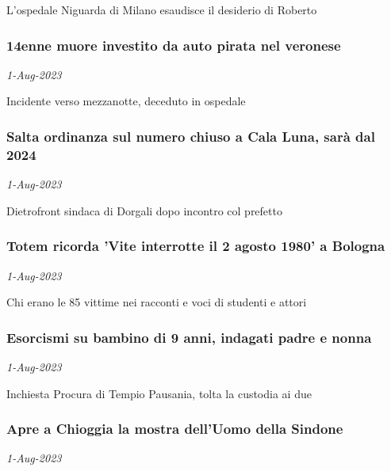 L'ospedale Niguarda di Milano esaudisce il desiderio di Roberto
\subsubsection{14enne muore investito da auto pirata nel veronese \href{https://www.ansa.it/sito/notizie/cronaca/2023/08/01/14enne-muore-investito-da-auto-pirata-nel-veronese_3a935f6f-c3d1-4bc3-8579-039319435df6.html}{}}
\textit{1-Aug-2023}

Incidente verso mezzanotte, deceduto in ospedale
\subsubsection{Salta ordinanza sul numero chiuso a Cala Luna, sar\`{a} dal 2024 \href{https://www.ansa.it/sito/notizie/cronaca/2023/08/01/salta-ordinanza-sul-numero-chiuso-a-cala-luna-sara-dal-2024_ebcdc2e1-25b6-4114-9f1d-d1417bf8f794.html}{}}
\textit{1-Aug-2023}

Dietrofront sindaca di Dorgali dopo incontro col prefetto
\subsubsection{Totem ricorda 'Vite interrotte il 2 agosto 1980' a Bologna \href{https://www.ansa.it/sito/notizie/cronaca/2023/08/01/totem-ricorda-vite-interrotte-il-2-agosto-1980-a-bologna_c80e7917-3604-4a93-9a0b-5dd5e783bdd8.html}{}}
\textit{1-Aug-2023}

Chi erano le 85 vittime nei racconti e voci di studenti e attori
\subsubsection{Esorcismi su bambino di 9 anni, indagati padre e nonna \href{https://www.ansa.it/sito/notizie/cronaca/2023/08/01/esorcismi-su-bambino-di-9-anni-indagati-padre-e-nonna_4f7ec762-f524-438f-b38b-90b12b60b0a4.html}{}}
\textit{1-Aug-2023}

Inchiesta Procura di Tempio Pausania, tolta la custodia ai due
\subsubsection{Apre a Chioggia la mostra dell'Uomo della Sindone \href{https://www.ansa.it/sito/notizie/cronaca/2023/08/01/apre-a-chioggia-la-mostra-delluomo-della-sindone_e7f60fa1-d76d-4b31-a666-a57148db02d7.html}{}}
\textit{1-Aug-2023}

